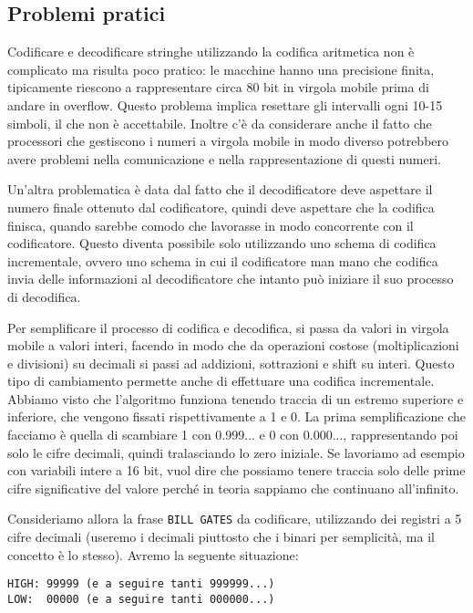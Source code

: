 \subsection{Problemi pratici}
Codificare e decodificare stringhe utilizzando la codifica aritmetica non è complicato ma risulta poco pratico: le macchine hanno una precisione finita, tipicamente riescono a rappresentare circa 80 bit in virgola mobile prima di andare in overflow. Questo problema implica resettare gli intervalli ogni 10-15 simboli, il che non è accettabile. Inoltre c'è da considerare anche il fatto che processori che gestiscono i numeri a virgola mobile in modo diverso potrebbero avere problemi nella comunicazione e nella rappresentazione di questi numeri. 

Un'altra problematica è data dal fatto che il decodificatore deve aspettare il numero finale ottenuto dal codificatore, quindi deve aspettare che la codifica finisca, quando sarebbe comodo che lavorasse in modo concorrente con il codificatore. Questo diventa possibile solo utilizzando uno schema di codifica incrementale, ovvero uno schema in cui il codificatore man mano che codifica invia delle informazioni al decodificatore che intanto può iniziare il suo processo di decodifica.

\vspace{5mm}

Per semplificare il processo di codifica e decodifica, si passa da valori in virgola mobile a valori interi, facendo in modo che da operazioni costose (moltiplicazioni e divisioni) su decimali si passi ad addizioni, sottrazioni e shift su interi. Questo tipo di cambiamento permette anche di effettuare una codifica incrementale. Abbiamo visto che l'algoritmo funziona tenendo traccia di un estremo superiore e inferiore, che vengono fissati rispettivamente a 1 e 0. La prima semplificazione che facciamo è quella di scambiare 1 con 0.999... e 0 con 0.000..., rappresentando poi solo le cifre decimali, quindi tralasciando lo zero iniziale. Se lavoriamo ad esempio con variabili intere a 16 bit, vuol dire che possiamo tenere traccia solo delle prime cifre significative del valore perché in teoria sappiamo che continuano all'infinito. 

Consideriamo allora la frase \texttt{BILL GATES} da codificare, utilizzando dei registri a 5 cifre decimali (useremo i decimali piuttosto che i binari per semplicità, ma il concetto è lo stesso). Avremo la seguente situazione:

\begin{lstlisting}
HIGH: 99999 (e a seguire tanti 999999...)
LOW:  00000 (e a seguire tanti 000000...)
\end{lstlisting}

